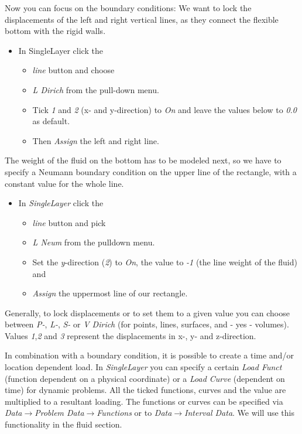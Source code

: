 Now you can focus on the boundary conditions: We want to lock the
displacements of the left and right vertical lines, as they connect
the flexible bottom with the rigid walls. 

\begin{itemize}
\item In SingleLayer click the 

\begin{itemize}
\item \emph{line} button and choose 
\item \emph{L Dirich} from the pull-down menu. 
\item Tick \emph{1} and \emph{2} (x- and y-direction) to \emph{On} and leave
the values below to \emph{0.0} as default.
\item Then \emph{Assign} the left and right line.
\end{itemize}
\end{itemize}
The weight of the fluid on the bottom has to be modeled next, so we
have to specify a Neumann boundary condition on the upper line of
the rectangle, with a constant value for the whole line. 

\begin{itemize}
\item In \emph{SingleLayer} click the 

\begin{itemize}
\item \emph{line} button and pick 
\item \emph{L Neum} from the pulldown menu.
\item Set the \emph{y}-direction (\emph{2}) to \emph{On}, the value to \emph{-1}
(the line weight of the fluid) and 
\item \emph{Assign} the uppermost line of our rectangle.
\end{itemize}
\end{itemize}
Generally, to lock displacements or to set them to a given value you
can choose between \emph{P-}, \emph{L-}, \emph{S-} or \emph{V Dirich}
(for points, lines, surfaces, and - yes - volumes). Values \emph{1},\emph{2}
and \emph{3} represent the displacements in x-, y- and z-direction.

In combination with a boundary condition, it is possible to
create a time and/or location dependent load. In \emph{SingleLayer}
you can specify a certain \emph{Load Funct} (function dependent on
a physical coordinate) or a \emph{Load Curve} (dependent on time)
for dynamic problems. All the ticked functions, curves and the value
are multiplied to a resultant loading. The functions or curves can
be specified via \emph{Data$\to$Problem Data$\to$Functions} or to
\emph{Data$\to$Interval Data}. We will use this functionality in the fluid section. 


